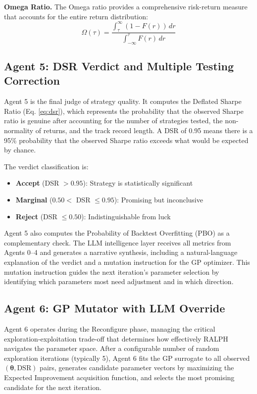 \documentclass[conference]{IEEEtran}
\begin{document}
\textbf{Omega Ratio.} The Omega ratio provides a comprehensive risk-return measure that accounts for the entire return distribution:
\begin{equation}
    \Omega(\tau) = \frac{\int_\tau^\infty (1 - F(r)) \, dr}{\int_{-\infty}^\tau F(r) \, dr}
\end{equation}

\subsection{Agent 5: DSR Verdict and Multiple Testing Correction}

Agent 5 is the final judge of strategy quality. It computes the Deflated Sharpe Ratio (Eq. \ref{eq:dsr}), which represents the probability that the observed Sharpe ratio is genuine after accounting for the number of strategies tested, the non-normality of returns, and the track record length. A DSR of 0.95 means there is a 95\% probability that the observed Sharpe ratio exceeds what would be expected by chance.

The verdict classification is:
\begin{itemize}
    \item \textbf{Accept} (DSR $> 0.95$): Strategy is statistically significant
    \item \textbf{Marginal} ($0.50 <$ DSR $\leq 0.95$): Promising but inconclusive
    \item \textbf{Reject} (DSR $\leq 0.50$): Indistinguishable from luck
\end{itemize}

Agent 5 also computes the Probability of Backtest Overfitting (PBO) as a complementary check. The LLM intelligence layer receives all metrics from Agents 0--4 and generates a narrative synthesis, including a natural-language explanation of the verdict and a mutation instruction for the GP optimizer. This mutation instruction guides the next iteration's parameter selection by identifying which parameters most need adjustment and in which direction.

\subsection{Agent 6: GP Mutator with LLM Override}

Agent 6 operates during the Reconfigure phase, managing the critical exploration-exploitation trade-off that determines how effectively RALPH navigates the parameter space. After a configurable number of random exploration iterations (typically 5), Agent 6 fits the GP surrogate to all observed $(\boldsymbol{\theta}, \text{DSR})$ pairs, generates candidate parameter vectors by maximizing the Expected Improvement acquisition function, and selects the most promising candidate for the next iteration.
\end{document}
